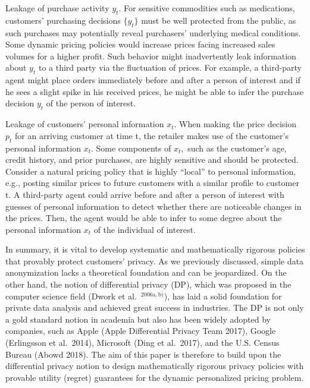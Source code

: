 Leakage of purchase activity \(y _ { t }\). For sensitive commodities such as medications, customers' purchasing decisions \(\{ y _ { t } \}\) must be well protected from the public, as such purchases may potentially reveal purchasers' underlying medical conditions. Some dynamic pricing policies would increase prices facing increased sales volumes for a higher profit. Such behavior might inadvertently leak information about \(y _ { t }\) to a third party via the fluctuation of prices. For example, a third-party agent might place orders immediately before and after a person of interest and if he sees a slight spike in his received prices, he might be able to infer the purchase decision \(y _ { t }\) of the person of interest.

Leakage of customers' personal information \(x _ { t }\). When making the price decision \(p _ { t }\) for an arriving customer at time t, the retailer makes use of the customer's personal information \(x _ { t }\). Some components of \(x _ { t } ,\) such as the customer's age, credit history, and prior purchases, are highly sensitive and should be protected. Consider a natural pricing policy that is highly ``local'' to personal information, e.g., posting similar prices to future customers with a similar profile to customer t. A third-party agent could arrive before and after a person of interest with guesses of personal information to detect whether there are noticeable changes in the prices. Then, the agent would be able to infer to some degree about the personal information \(x _ { t }\) of the individual of interest.

In summary, it is vital to develop systematic and mathematically rigorous policies that provably protect customers' privacy. As we previously discussed, simple data anonymization lacks a theoretical foundation and can be jeopardized. On the other hand, the notion of differential privacy (DP), which was proposed in the computer science field (Dwork et al.~\(^ { 2 0 0 6 \mathrm { a } , \mathrm { b } ) }\)), has laid a solid foundation for private data analysis and achieved great success in industries. The DP is not only a gold standard notion in academia but also has been widely adopted by companies, such as Apple (Apple Differential Privacy Team 2017), Google (Erlingsson et al.~2014), Microsoft (Ding et al.~2017), and the U.S. Census Bureau (Abowd 2018). The aim of this paper is therefore to build upon the differential privacy notion to design mathematically rigorous privacy policies with provable utility (regret) guarantees for the dynamic personalized pricing problem.

